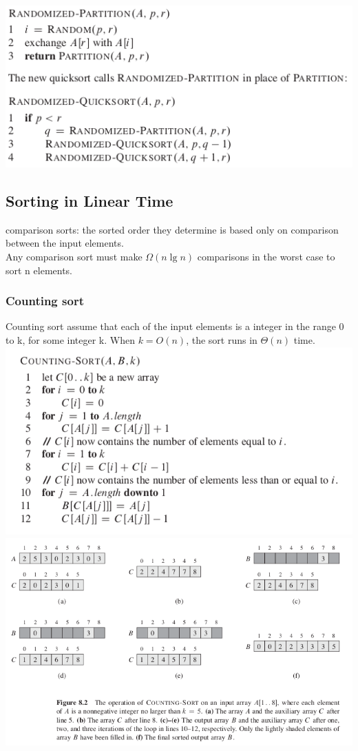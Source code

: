 \documentclass[11pt]{article}
\begin{document}
\includegraphics[width=.9\linewidth]{pics/c7_randomized_quicksort.png} \\

\subsection{Sorting in Linear Time}
\label{sec-3-3}
comparison sorts: the sorted order they determine is based only on comparison between the input elements. \\

Any comparison sort must make $\Omega(n\lg n)$ comparisons in the worst case to sort n elements. \\

\subsubsection{Counting sort}
\label{sec-3-3-1}
Counting sort assume that each of the input elements is a integer in the range 0 to k, for some integer k. When $k=O(n)$, the sort runs in $\Theta(n)$ time. \\

\includegraphics[width=.9\linewidth]{pics/c8_counting_sort.png} \\

\includegraphics[width=.9\linewidth]{pics/c8_counting_sort_fig.png} \\
\end{document}
